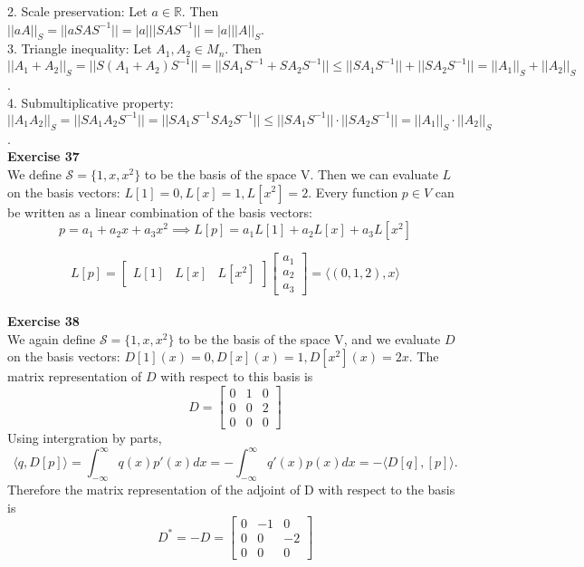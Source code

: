 \documentclass[letterpaper,12pt]{article}
\theoremstyle{definition}
\begin{document}
2. Scale preservation: Let $a \in \mathbb{R}.$ Then $||aA||_S = ||aSAS^{-1}|| = |a| ||SAS^{-1}|| = |a| ||A||_S$. \\

3. Triangle inequality: Let $A_1, A_2 \in M_n$. Then $||A_1 + A_2||_S = ||S(A_1 + A_2)S^{-1}|| = ||SA_1S^{-1} + SA_2S^{-1}|| \leq ||SA_1S^{-1}|| + ||SA_2S^{-1}|| = ||A_1||_S + ||A_2||_S$. \\

4. Submultiplicative property: $||A_1A_2||_S = ||SA_1A_2S^{-1}|| = ||SA_1S^{-1}SA_2S^{-1}|| \leq ||SA_1S^{-1}|| \cdot ||SA_2S^{-1}|| = ||A_1||_S \cdot ||A_2||_S$. \\

\textbf{Exercise 37} \\
We define $\mathcal{S} = \{1, x, x^2\}$ to be the basis of the space V. Then we can evaluate $L$ on the basis vectors: $L[1] = 0, L[x] = 1, L[x^2] = 2$. Every function $p \in V$ can be written as a linear combination of the basis vectors:
\begin{equation*}
  p = a_1 + a_2 x + a_3 x^2 \implies L[p] = a_1 L[1] + a_2 L[x] + a_3 L[x^2]
\end{equation*}

\[
L[p] =
\begin{bmatrix}
  L[1] & L[x] & L[x^2]
\end{bmatrix}
\begin{bmatrix}
  a_1 \\
  a_2 \\
  a_3
\end{bmatrix}
= \langle (0, 1, 2), x \rangle
\] \\

\textbf{Exercise 38} \\
We again define $\mathcal{S} = \{1, x, x^2\}$ to be the basis of the space V, and we evaluate $D$ on the basis vectors: $D[1](x) = 0, D[x](x) = 1, D[x^2](x) = 2x$. The matrix representation of $D$ with respect to this basis is
\[
D =
\begin{bmatrix}
  0 & 1 & 0 \\
  0 & 0 & 2 \\
  0 & 0 & 0
\end{bmatrix}
\]
Using intergration by parts,
\begin{equation*}
  \langle q, D[p] \rangle = \int_{-\infty}^{\infty} q(x) p'(x) dx = - \int_{-\infty}^\infty q'(x) p(x) dx = -\langle D[q], [p] \rangle.
\end{equation*}
Therefore the matrix representation of the adjoint of D with respect to the basis is
\[
D^* = -D =
\begin{bmatrix}
  0 & -1 & 0 \\
  0 & 0 & -2 \\
  0 & 0 & 0
\end{bmatrix}
\]
\end{document}
